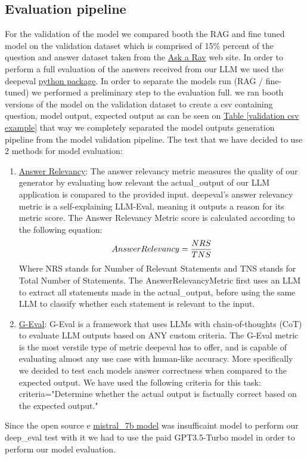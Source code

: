 \documentclass[11pt]{article}
\begin{document}
\subsection{Evaluation pipeline}

For the validation of the model we compared booth the RAG and fine tuned model on the validation dataset which is comprised of  15\% percent of the question and answer dataset taken from the \href{https://asktherav.com/ }{Ask a Rav} web site.
In order to perform a full evaluation of the answers received from our LLM we used the deepeval  \href{https://docs.confident-ai.com/ }{python package}.
In order to separate the models run (RAG / fine-tuned) we performed a preliminary step to the evaluation full. we ran booth versions of the model on the validation dataset to create a csv containing question, model output, expected output as can be seen on  \href{#tab:example}{Table \ref*{validation csv example}} that way we completely separated the model outputs generation pipeline  from the model validation pipeline.
The test that we have decided to use 2 methods for model evaluation:
\begin{enumerate}
    \item   \href{https://docs.confident-ai.com/docs/metrics-answer-relevancy }{Answer Relevancy}: The answer relevancy metric measures the quality of our generator by evaluating how relevant the actual\_output of our LLM application is compared to the provided input. deepeval's answer relevancy metric is a self-explaining LLM-Eval, meaning it outputs a reason for its metric score.
    The Answer Relevancy Metric score is calculated according to the following equation:
    \[Answer Relevancy = \\  \frac{NRS}{TNS} \]
    Where NRS stands for Number of Relevant Statements and TNS stands for Total Number of Statements.
    The AnswerRelevancyMetric first uses an LLM to extract all statements made in the actual\_output, before using the same LLM to classify whether each statement is relevant to the input.
     \item \href{https://docs.confident-ai.com/docs/metrics-llm-evals}{G-Eval}: G-Eval is a framework that uses LLMs with chain-of-thoughts (CoT) to evaluate LLM outputs based on ANY custom criteria. The G-Eval metric is the most verstile type of metric deepeval has to offer, and is capable of evaluating almost any use case with human-like accuracy.
     More specifically we decided to test each models answer correctness when compared to the expected output.
     We have used the following criteria for this task:
     criteria="Determine whether the actual output is factually correct based on the expected output."
     
    
\end{enumerate}
Since the open source e \href{https://mistral.ai/news/announcing-mistral-7b/ }{mistral\_7b model} was insufficaint model to perform our deep\_eval test with it we had to use the paid  GPT3.5-Turbo model in order to perform our model evaluation.
\end{document}
